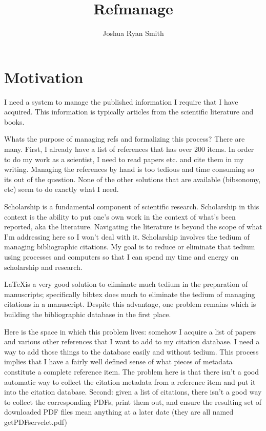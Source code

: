 \documentclass[letterpaper,12pt]{article}
\title{Refmanage}
\author{Joshua Ryan Smith}
\begin{document}
\maketitle




\section{Motivation}
I need a system to manage the published information I require that I have acquired. This information is typically articles from the scientific literature and books. 

Whats the purpose of managing refs and formalizing this process? There are many. First, I already have a list of references that has over 200 items. In order to do my work as a scientist, I need to read papers etc. and cite them in my writing. Managing the references by hand is too tedious and time consuming so its out of the question. None of the other solutions that are available (bibsonomy, etc) seem to do exactly what I need.

Scholarship is a fundamental component of scientific research. Scholarship in this context is the ability to put one's own work in the context of what's been reported, aka the literature. Navigating the literature is beyond the scope of what I'm addressing here so I won't deal with it. Scholarship involves the tedium of managing bibliographic citations. My goal is to reduce or eliminate that tedium using processes and computers so that I can spend my time and energy on scholarship and research.

\LaTeX is a very good solution to eliminate much tedium in the preparation of manuscripts; specifically bibtex does much to eliminate the tedium of managing citations in a manuscript. Despite this advantage, one problem remains which is building the bibliographic database in the first place.

Here is the space in which this problem lives: somehow I acquire a list of papers and various other references that I want to add to my citation database. I need a way to add those things to the database easily and without tedium. This process implies that I have a fairly well defined sense of what pieces of metadata constitute a complete reference item. The problem here is that there isn't a good automatic way to collect the citation metadata from a reference item and put it into the citation database. Second: given a list of citations, there isn't a good way to collect the corresponding PDFs, print them out, and ensure the resulting set of downloaded PDF files mean anything at a later date (they are all named getPDFservelet.pdf)
\end{document}
